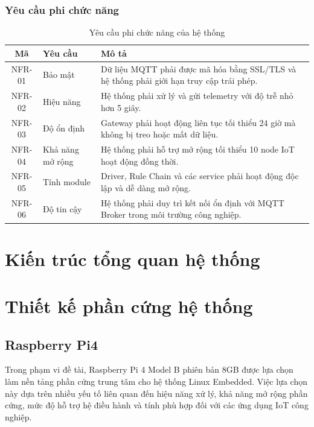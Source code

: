 \subsubsection{Yêu cầu phi chức năng}
\begin{table}[H]
\centering
\caption{Yêu cầu phi chức năng của hệ thống}
\label{tab:nonfunctional_requirements}

\begin{tabular}{|c|p{3.5cm}|p{8cm}|}
\hline
\textbf{Mã} & \textbf{Yêu cầu} & \textbf{Mô tả} \\ \hline

NFR-01 &
Bảo mật &
Dữ liệu MQTT phải được mã hóa bằng SSL/TLS và hệ thống phải giới hạn truy cập trái phép. \\ \hline

NFR-02 &
Hiệu năng &
Hệ thống phải xử lý và gửi telemetry với độ trễ nhỏ hơn 5 giây. \\ \hline

NFR-03 &
Độ ổn định &
Gateway phải hoạt động liên tục tối thiểu 24 giờ mà không bị treo hoặc mất dữ liệu. \\ \hline

NFR-04 &
Khả năng mở rộng &
Hệ thống phải hỗ trợ mở rộng tối thiểu 10 node IoT hoạt động đồng thời. \\ \hline

NFR-05 &
Tính module &
Driver, Rule Chain và các service phải hoạt động độc lập và dễ dàng mở rộng. \\ \hline

NFR-06 &
Độ tin cậy &
Hệ thống phải duy trì kết nối ổn định với MQTT Broker trong môi trường công nghiệp. \\ \hline

\end{tabular}
\end{table}

\section{Kiến trúc tổng quan hệ thống}

\section{Thiết kế phần cứng hệ thống}
\subsection{Raspberry Pi4}

Trong phạm vi đề tài, Raspberry Pi 4 Model B phiên bản 8GB được lựa chọn làm nền tảng phần cứng trung tâm cho hệ thống Linux Embedded. Việc lựa chọn này dựa trên nhiều yếu tố liên quan đến hiệu năng xử lý, khả năng mở rộng phần cứng, mức độ hỗ trợ hệ điều hành và tính phù hợp đối với các ứng dụng IoT công nghiệp.

